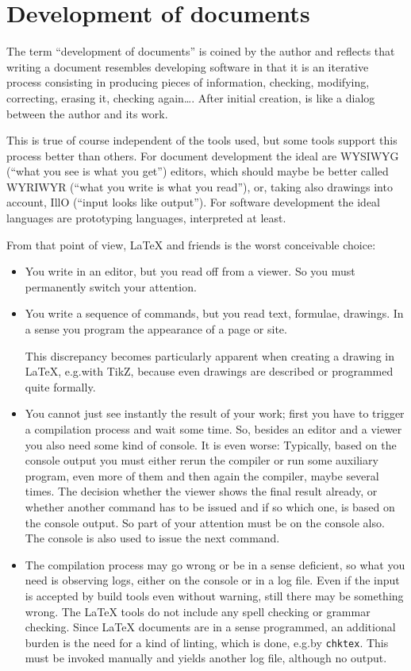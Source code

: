 \section{Development of documents}\label{sec:devel}

The term ``development of documents'' is coined by the author 
and reflects that writing a document 
resembles developing software 
in that it is an iterative process consisting in producing pieces of information, 
checking, modifying, correcting, erasing it, checking again\dots. 
After initial creation, is like a dialog between the author and its work. 

This is true of course independent of the tools used, 
but some tools support this process better than others. 
For document development the ideal are WYSIWYG (``what you see is what you get'') editors, 
which should maybe be better called WYRIWYR (``what you write is what you read''), 
or, taking also drawings into account, IllO (``input looks like output''). %
For software development the ideal languages are prototyping languages, interpreted at least. 

From that point of view, \LaTeX{} and friends is the worst conceivable choice: 
%
\begin{itemize}
  \item
  You write in an editor, but you read off from a viewer. 
  So you must permanently switch your attention. 
  \item
  You write a sequence of commands, but you read text, formulae, drawings. 
  In a sense you program the appearance of a page or site. 

  This discrepancy becomes particularly apparent when creating a drawing in \LaTeX, 
  e.g.\@ with TikZ, because even drawings are described or programmed quite formally. 
  \item
  You cannot just see instantly the result of your work; 
  first you have to trigger a compilation process and wait some time. 
  So, besides an editor and a viewer you also need some kind of console. 
  It is even worse: 
  Typically, based on the console output you must either rerun the compiler 
  or run some auxiliary program, even more of them 
  and then again the compiler, maybe several times. 
  The decision whether the viewer shows the final result already, 
  or whether another command has to be issued and if so which one, 
  is based on the console output. 
  So part of your attention must be on the console also. 
  The console is also used to issue the next command. 
  \item 
  The compilation process may go wrong or be in a sense deficient, 
  so what you need is observing logs, either on the console or in a log file. 
  Even if the input is accepted by build tools even without warning, 
  still there may be something wrong. 
  The \LaTeX{} tools do not include any spell checking or grammar checking. 
  Since \LaTeX{} documents are in a sense programmed, 
  an additional burden is the need for a kind of linting, 
  which is done, e.g.\@ by \texttt{chktex}. 
  This must be invoked manually and yields another log file, 
  although no output. 
\end{itemize}

